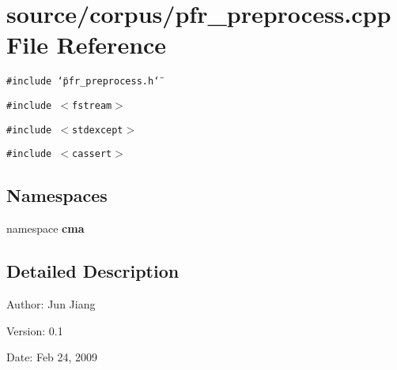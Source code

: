 \section{source/corpus/pfr\_\-preprocess.cpp File Reference}
\label{pfr__preprocess_8cpp}
{\tt \#include \char`\"{}pfr\_\-preprocess.h\char`\"{}}\par
{\tt \#include $<$fstream$>$}\par
{\tt \#include $<$stdexcept$>$}\par
{\tt \#include $<$cassert$>$}\par
\subsection*{Namespaces}
\begin{CompactItemize}
\item 
namespace \textbf{cma}
\end{CompactItemize}


\subsection{Detailed Description}
\begin{Desc}
\item[Author:]Jun Jiang \end{Desc}
\begin{Desc}
\item[Version:]0.1 \end{Desc}
\begin{Desc}
\item[Date:]Feb 24, 2009 \end{Desc}
